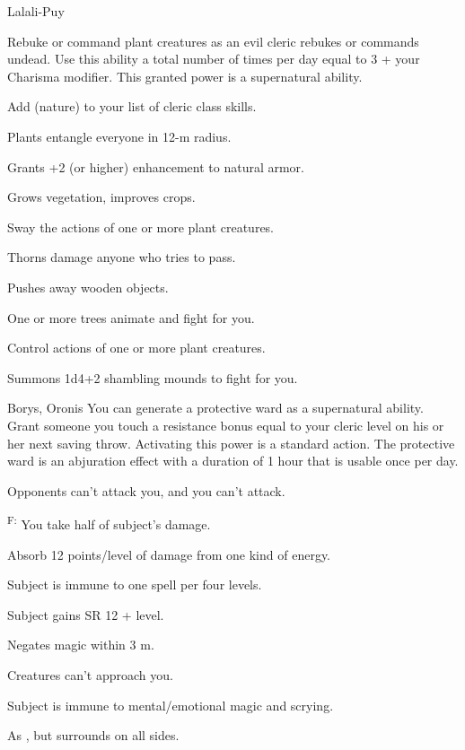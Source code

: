 {Lalali-Puy}
{Rebuke or command plant creatures as an evil cleric rebukes or commands undead. Use this ability a total number of times per day equal to 3 + your Charisma modifier. This granted power is a supernatural ability.

Add  (nature) to your list of cleric class skills.}
{
	\item {} Plants entangle everyone in 12-m radius.
	\item {} Grants +2 (or higher) enhancement to natural armor.
	\item {} Grows vegetation, improves crops.
	\item {} Sway the actions of one or more plant creatures.
	\item {} Thorns damage anyone who tries to pass.
	\item {} Pushes away wooden objects.
	\item {} One or more trees animate and fight for you.
	\item {} Control actions of one or more plant creatures.
	\item {} Summons 1d4+2 shambling mounds to fight for you.
}

{Borys, Oronis}
{You can generate a protective ward as a supernatural ability. Grant someone you touch a resistance bonus equal to your cleric level on his or her next saving throw. Activating this power is a standard action. The protective ward is an abjuration effect with a duration of 1 hour that is usable once per day.}
{
	\item {} Opponents can't attack you, and you can't attack.
	\item {}\textsuperscript{F:} You take half of subject's damage.
	\item {} Absorb 12 points/level of damage from one kind of energy.
	\item {} Subject is immune to one spell per four levels.
	\item {} Subject gains SR 12 + level.
	\item {} Negates magic within 3 m.
	\item {} Creatures can't approach you.
	\item {} Subject is immune to mental/emotional magic and scrying.
	\item {} As , but surrounds on all sides.
}

